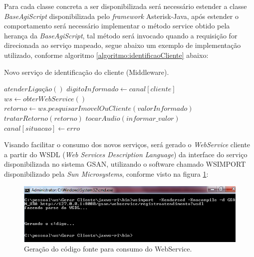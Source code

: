 Para cada classe concreta a ser disponibilizada será necessário estender a classe \textit{BaseAgiScript} disponibilizada pelo \textit{framework} Asterisk-Java, após estender o comportamento será necessário implementar o método service obtido pela herança da \textit{BaseAgiScript}, tal método será invocado quando a requisição for direcionada ao serviço mapeado, segue abaixo um exemplo de implementação utilizado, conforme algoritmo \ref{algoritmo:identificaoCliente} abaixo:


\begin{algorithm}
	\caption{Novo serviço de identificação do cliente (Middleware).}	
	\label{algoritmo:identificaoCliente}
	\begin{algorithmic}[1]
		\STATE $atenderLigação()$ 		
		\STATE $digitoInformado \gets canal[cliente]$ 	
		\STATE $ws \gets obterWebService() $ 
		\STATE $retorno \gets ws.pesquisarImovelOuCliente(valorInformado) $
		\STATE $ tratarRetorno(retorno) $
		\ELSE		
		\STATE $ tocarAudio(informar\_valor) $
		\STATE $ canal[situacao] \leftarrow erro $
		\ENDIF		
	\end{algorithmic}
\end{algorithm}


Visando facilitar o consumo dos novos serviços, será gerado o \textit{WebService} cliente a partir do WSDL (\textit{Web Services Description Language}) da interface do serviço disponibilizada no sistema GSAN, utilizando o software chamado WSIMPORT disponibilizado pela \textit{Sun Microsystems}, conforme visto na figura \ref{figura:gerarWSCliente}:

\begin{figure}[!htb]
	\centering
	\caption{Geração do código fonte para consumo do WebService.}	
	\label{figura:gerarWSCliente}
	\includegraphics{figuras/gerar_wscliente.png}
\end{figure}

